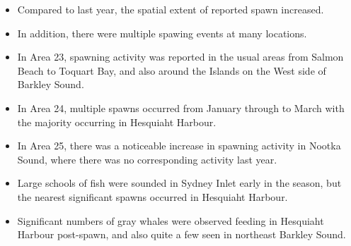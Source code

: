 \begin{itemize}
\item Compared to last year, the spatial extent of reported spawn increased.
\item In addition, there were multiple spawing events at many locations.
\item In Area 23, spawning activity was reported in the usual areas from Salmon Beach to Toquart Bay, and also around the Islands on the West side of Barkley Sound.
\item In Area 24, multiple spawns occurred from January through to March with the majority occurring in Hesquiaht Harbour.
\item In Area 25, there was a noticeable increase in spawning activity in Nootka Sound, where there was no corresponding activity last year.
\item Large schools of fish were sounded in Sydney Inlet early in the season, but the nearest significant spawns occurred in Hesquiaht Harbour.
\item Significant numbers of gray whales were observed feeding in Hesquiaht Harbour post-spawn, and also quite a few seen in northeast Barkley Sound.
\end{itemize}